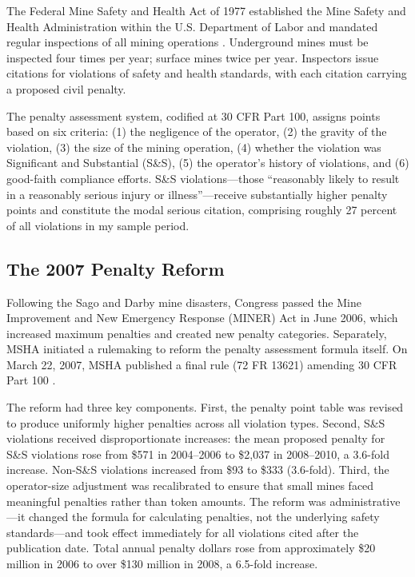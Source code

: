 \documentclass[12pt]{article}
\begin{document}
The Federal Mine Safety and Health Act of 1977 established the Mine Safety and Health Administration within the U.S. Department of Labor and mandated regular inspections of all mining operations \citep{msha1977act}. Underground mines must be inspected four times per year; surface mines twice per year. Inspectors issue citations for violations of safety and health standards, with each citation carrying a proposed civil penalty.

The penalty assessment system, codified at 30 CFR Part 100, assigns points based on six criteria: (1) the negligence of the operator, (2) the gravity of the violation, (3) the size of the mining operation, (4) whether the violation was Significant and Substantial (S\&S), (5) the operator's history of violations, and (6) good-faith compliance efforts. S\&S violations---those ``reasonably likely to result in a reasonably serious injury or illness''---receive substantially higher penalty points and constitute the modal serious citation, comprising roughly 27 percent of all violations in my sample period.

\subsection{The 2007 Penalty Reform}

Following the Sago and Darby mine disasters, Congress passed the Mine Improvement and New Emergency Response (MINER) Act in June 2006, which increased maximum penalties and created new penalty categories. Separately, MSHA initiated a rulemaking to reform the penalty assessment formula itself. On March 22, 2007, MSHA published a final rule (72 FR 13621) amending 30 CFR Part 100 \citep{msha2007rule}.

The reform had three key components. First, the penalty point table was revised to produce uniformly higher penalties across all violation types. Second, S\&S violations received disproportionate increases: the mean proposed penalty for S\&S violations rose from \$571 in 2004--2006 to \$2,037 in 2008--2010, a 3.6-fold increase. Non-S\&S violations increased from \$93 to \$333 (3.6-fold). Third, the operator-size adjustment was recalibrated to ensure that small mines faced meaningful penalties rather than token amounts. The reform was administrative---it changed the formula for calculating penalties, not the underlying safety standards---and took effect immediately for all violations cited after the publication date. Total annual penalty dollars rose from approximately \$20 million in 2006 to over \$130 million in 2008, a 6.5-fold increase.
\end{document}
